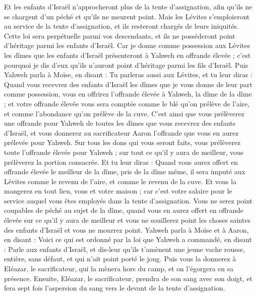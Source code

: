 \begin{multicols}{2}
Et les enfants d'Israël n'approcheront plus de la tente d'assignation, afin qu'ils ne se chargent d'un péché et qu'ils ne meurent point.
Mais les Lévites s'emploieront au service de la tente d'assignation, et ils resteront chargés de leurs iniquités. Cette loi sera perpétuelle parmi vos descendants, et ils ne posséderont point d'héritage parmi les enfants d'Israël.
Car je donne comme possession aux Lévites les dîmes que les enfants d'Israël présenteront à Yahweh en offrande élevée ; c'est pourquoi je dis d'eux qu'ils n'auront point d'héritage parmi les fils d'Israël.
Puis Yahweh parla à Moïse, en disant :
Tu parleras aussi aux Lévites, et tu leur diras : Quand vous recevrez des enfants d'Israël les dîmes que je vous donne de leur part comme possession, vous en offrirez l'offrande élevée à Yahweh, la dîme de la dîme ;
et votre offrande élevée vous sera comptée comme le blé qu'on prélève de l'aire, et comme l'abondance qu'on prélève de la cuve.
C'est ainsi que vous prélèverez une offrande pour Yahweh de toutes les dîmes que vous recevrez des enfants d'Israël, et vous donnerez au sacrificateur Aaron l'offrande que vous en aurez prélevée pour Yahweh.
Sur tous les dons qui vous seront faits, vous prélèverez toute l'offrande élevée pour Yahweh ; sur tout ce qu'il y aura de meilleur, vous prélèverez la portion consacrée.
Et tu leur diras : Quand vous aurez offert en offrande élevée le meilleur de la dîme, pris de la dîme même, il sera imputé aux Lévites comme le revenu de l'aire, et comme le revenu de la cuve.
Et vous la mangerez en tout lieu, vous et votre maison ; car c'est votre salaire pour le service auquel vous êtes employés dans la tente d'assignation.
Vous ne serez point coupables de péché au sujet de la dîme, quand vous en aurez offert en offrande élevée sur ce qu'il y aura de meilleur et vous ne souillerez point les choses saintes des enfants d'Israël et vous ne mourrez point.
\VerseOne{}Yahweh parla à Moïse et à Aaron, en disant :
Voici ce qui est ordonné par la loi que Yahweh a commandé, en disant : Parle aux enfants d'Israël, et dis-leur qu'ils t'amènent une jeune vache rousse, entière, sans défaut, et qui n'ait point porté le joug.
Puis vous la donnerez à Eléazar, le sacrificateur, qui la mènera hors du camp, et on l'égorgera en sa présence.
Ensuite, Eléazar, le sacrificateur, prendra de son sang avec son doigt, et fera sept fois l'aspersion du sang vers le devant de la tente d'assignation.

\end{multicols}
